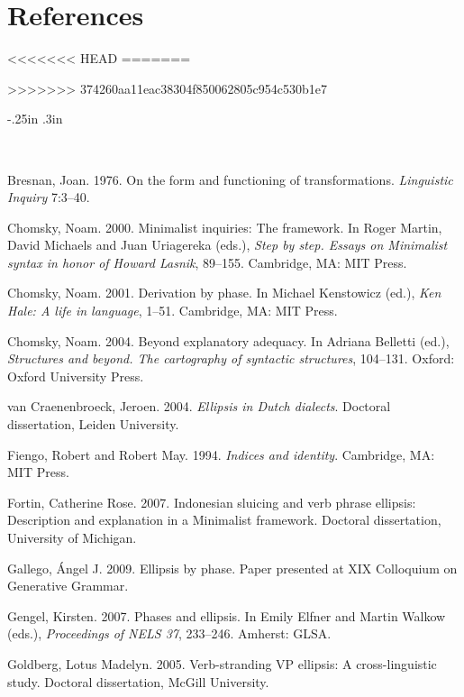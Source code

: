 \documentclass[output=paper]{LSP/langsci}
\begin{document}
\section*{References}
<<<<<<< HEAD
 \printbibliography[heading=subbibliography,notkeyword=this]
=======

\newenvironment{reflist} {\begin{list} {} {\listparindent -.25in
\leftmargin .3in} \item \ \vspace{-.3in} } {\end{list} }
>>>>>>> 374260aa11eac38304f850062805c954c530b1e7

\begin{reflist}

Bresnan, Joan. 1976. On the form and functioning of transformations. \emph{Linguistic Inquiry} 7:3--40.

Chomsky, Noam. 2000. Minimalist inquiries: The framework. In Roger Martin, David Michaels and Juan Uriagereka (eds.), \emph{Step by step. Essays on Minimalist syntax in honor of Howard Lasnik}, 89--155. Cambridge, MA: MIT Press.

Chomsky, Noam. 2001. Derivation by phase. In Michael Kenstowicz (ed.), \emph{Ken Hale: A life in language}, 1--51. Cambridge, MA: MIT Press.

Chomsky, Noam. 2004. Beyond explanatory adequacy. In Adriana Belletti (ed.), \emph{Structures and beyond. The cartography of syntactic structures}, 104--131. Oxford: Oxford University Press.

van Craenenbroeck, Jeroen. 2004. \emph{Ellipsis in Dutch dialects}. Doctoral dissertation, Leiden University.

Fiengo, Robert and Robert May. 1994. \emph{Indices and identity}. Cambridge, MA: MIT Press.

Fortin, Catherine Rose. 2007. Indonesian sluicing and verb phrase ellipsis: Description and explanation in a Minimalist framework. Doctoral dissertation, University of Michigan. 

Gallego, \'{A}ngel J. 2009. Ellipsis by phase. Paper presented at XIX Colloquium on Generative Grammar. 

Gengel, Kirsten. 2007. Phases and ellipsis. In Emily Elfner and Martin Walkow (eds.), \emph{Proceedings of NELS 37}, 233--246. Amherst: GLSA. 

Goldberg, Lotus Madelyn. 2005. Verb-stranding VP ellipsis: A cross-linguistic study. Doctoral dissertation, McGill University. 


\end{reflist}
\end{document}
